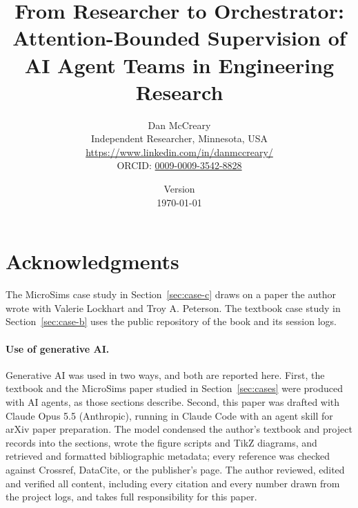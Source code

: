 \documentclass[11pt]{article}
\title{From Researcher to Orchestrator: Attention-Bounded Supervision of AI Agent Teams in Engineering Research}
\author{
    Dan McCreary \\
    Independent Researcher, Minnesota, USA \\
    \small\url{https://www.linkedin.com/in/danmccreary/} \\
    \small ORCID: \href{https://orcid.org/0009-0009-3542-8828}{0009-0009-3542-8828}
}
\date{Version \paperversion \\ \today}
\begin{document}
\maketitle










\section*{Acknowledgments}
The MicroSims case study in Section~\ref{sec:case-c} draws on a paper the author wrote
with Valerie Lockhart and Troy A. Peterson. The textbook case study in
Section~\ref{sec:case-b} uses the public repository of the book and its session logs.

\paragraph{Use of generative AI.}
Generative AI was used in two ways, and both are reported here. First, the textbook and
the MicroSims paper studied in Section~\ref{sec:cases} were produced with AI agents, as
those sections describe. Second, this paper was drafted with Claude Opus 5.5 (Anthropic),
running in Claude Code with an agent skill for arXiv paper preparation. The model
condensed the author's textbook and project records into the sections, wrote the figure
scripts and TikZ diagrams, and retrieved and formatted bibliographic metadata; every
reference was checked against Crossref, DataCite, or the publisher's page. The author
reviewed, edited and verified all content, including every citation and every number
drawn from the project logs, and takes full responsibility for this paper.



\end{document}

